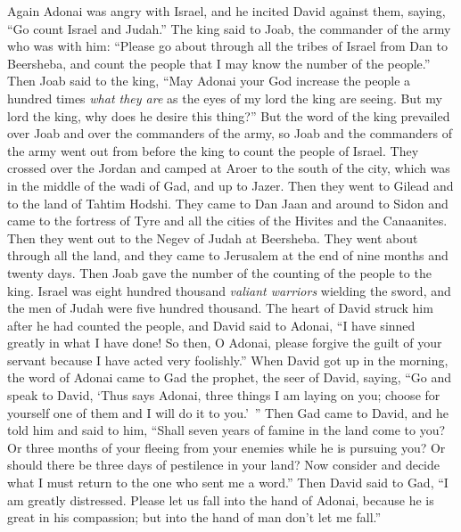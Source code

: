 \begin{biblechapter} %
 Again Adonai was angry with Israel, and he incited David against them, saying, “Go count Israel and Judah.”
\verse The king said to Joab, the commander of the army who was with him: “Please go about through all the tribes of Israel from Dan to Beersheba, and count the people that I may know the number of the people.”
\verse Then Joab said to the king, “May Adonai your God increase the people a hundred times \textit{what they are} as the eyes of my lord the king are seeing. But my lord the king, why does he desire this thing?”
\verse But the word of the king prevailed over Joab and over the commanders of the army, so Joab and the commanders of the army went out from before the king to count the people of Israel.
\verse They crossed over the Jordan and camped at Aroer to the south of the city, which was in the middle of the wadi of Gad, and up to Jazer.
\verse Then they went to Gilead and to the land of Tahtim Hodshi. They came to Dan Jaan and around to Sidon
\verse and came to the fortress of Tyre and all the cities of the Hivites and the Canaanites. Then they went out to the Negev of Judah at Beersheba.
\verse They went about through all the land, and they came to Jerusalem at the end of nine months and twenty days.
\verse Then Joab gave the number of the counting of the people to the king. Israel was eight hundred thousand \textit{valiant warriors} wielding the sword, and the men of Judah were five hundred thousand.
\verse The heart of David struck him after he had counted the people, and David said to Adonai, “I have sinned greatly in what I have done! So then, O Adonai, please forgive the guilt of your servant because I have acted very foolishly.”
\verse When David got up in the morning, the word of Adonai came to Gad the prophet, the seer of David, saying,
\verse “Go and speak to David, ‘Thus says Adonai, three things I am laying on you; choose for yourself one of them and I will do it to you.’ ”
\verse Then Gad came to David, and he told him and said to him, “Shall seven years of famine in the land come to you? Or three months of your fleeing from your enemies while he is pursuing you? Or should there be three days of pestilence in your land? Now consider and decide what I must return to the one who sent me a word.”
\verse Then David said to Gad, “I am greatly distressed. Please let us fall into the hand of Adonai, because he is great in his compassion; but into the hand of man don’t let me fall.”

\end{biblechapter}
